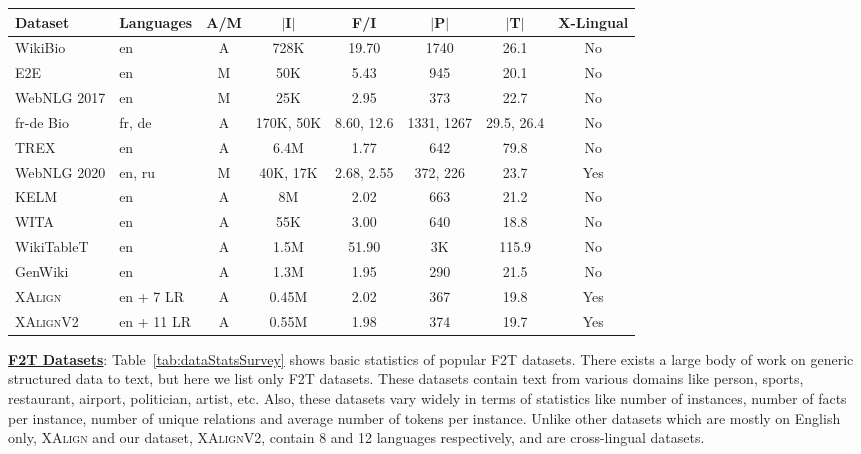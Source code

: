 \documentclass[runningheads]{llncs}
\newcommand{\data}{\textsc{XAlignV2}}
\begin{document}
\begin{table*}[!b]
    \centering
    \scriptsize
    \begin{tabular}{|l|l|c|c|c|c|c|c|}
    \hline
Dataset&Languages&A/M&$|$I$|$&F/I&$|$P$|$&$|$T$|$&X-Lingual\\
\hline
\hline
WikiBio&en&A&728K&19.70&1740&26.1&No\\
\hline
E2E&en&M&50K&5.43&945&20.1&No\\
\hline
WebNLG 2017&en&M&25K&2.95&373&22.7&No\\
\hline
fr-de Bio&fr, de&A&170K, 50K&8.60, 12.6&1331, 1267&29.5, 26.4&No\\
\hline
TREX&en&A&6.4M&1.77&642&79.8&No\\
\hline
WebNLG 2020&en, ru&M&40K, 17K&2.68, 2.55&372, 226&23.7 &Yes\\
\hline
KELM&en&A&8M&2.02&663&21.2&No\\
\hline
WITA&en&A&55K&3.00&640&18.8&No\\
\hline
WikiTableT&en&A&1.5M&51.90&3K&115.9&No\\
\hline
GenWiki&en&A&1.3M&1.95&290&21.5&No\\
\hline
\textsc{XAlign}&en + 7 LR&A&0.45M&2.02&367&19.8&Yes\\
\hline
\hline
\data{}&en + 11 LR&A&0.55M&1.98&374&19.7&Yes\\
\hline
    \end{tabular}
    \caption{Statistics of popular Fact-to-Text datasets: WikiBio~\cite{lebret2016wikibio}, E2E~\cite{novikova2017e2e}, WebNLG 2017~\cite{gardent2017webnlg}, WebNLG 2020~\cite{ferreira20202020}, fr-de Bio~\cite{nema2018generating}, KELM~\cite{agarwal2021knowledge}, WITA~\cite{fu2020partially}, WikiTableT~\cite{chen2021wikitablet}, GenWiki~\cite{jin2020genwiki}, TREX~\cite{elsahar2018trex},  XAlign~\cite{abhishek2022xalign}, and \data{} (ours). Alignment method could be A (automatic) or M (manual). $|$I$|$=number of instances. F/I=number of facts per instance. $|$P$|$=number of unique relations. $|$T$|$=average number of tokens per instance.}
    \label{tab:dataStatsSurvey}
\end{table*}

\noindent\underline{\textbf{F2T Datasets}}: Table~\ref{tab:dataStatsSurvey} shows basic statistics of popular F2T datasets. There exists a large body of work on generic structured data to text, but here we list only F2T datasets. These datasets contain text from various domains like person, sports, restaurant, airport, politician, artist, etc. Also, these datasets vary widely in terms of statistics like number of instances, number of facts per instance, number of unique relations and average number of tokens per instance. Unlike other datasets which are mostly on English only, \textsc{XAlign} and our dataset, \data{}, contain 8 and 12 languages respectively, and are cross-lingual datasets. 
\end{document}
